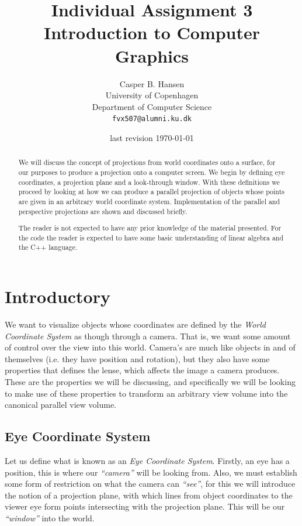 \documentclass[11pt]{article}
\title
{
    {\Large Individual Assignment 3} \\
    Introduction to Computer Graphics
}
\author
{
    Casper B. Hansen \\
    University of Copenhagen \\
    Department of Computer Science \\
    {\tt fvx507@alumni.ku.dk}
}
\date{last revision \today}
\begin{document}
\clearpage\maketitle\vspace{1in}
\begin{multicols}{2}
    \begin{abstract}
        We will discuss the concept of projections from world coordinates onto
        a surface, for our purposes to produce a projection onto a computer
        screen. We begin by defining eye coordinates, a projection plane and
        a look-through window. With these definitions we proceed by looking at
        how we can produce a parallel projection of objects whose points are
        given in an arbitrary world coordinate system. Implementation of the
        parallel and perspective projections are shown and discussed briefly.
        
        The reader is not expected to have any prior knowledge of the material
        presented. For the code the reader is expected to have some basic
        understanding of linear algebra  and the C++ language.
    \end{abstract}
    \vfill\columnbreak\tableofcontents\vfill
\end{multicols}
\thispagestyle{empty}\newpage

\section{Introductory}
We want to visualize objects whose coordinates are defined by the {\it World
Coordinate System} as though through a camera. That is, we want some amount of
control over the view into this world. Camera's are much like objects in and
of themselves (i.e. they have position and rotation), but they also have some
properties that defines the lense, which affects the image a camera produces.
These are the properties we will be discussing, and specifically we will be
looking to make use of these properties to transform an arbitrary view volume
into the canonical parallel view volume.

\subsection{Eye Coordinate System}
\label{sec:intro|sub:eye-coord-sys}
Let us define what is known as an {\it Eye Coordinate System}. Firstly, an eye
has a position, this is where our {\it ``camera''} will be looking from. Also,
we must establish some form of restriction on what the camera can
{\it ``see''}, for this we will introduce the notion of a projection plane,
with which lines from object coordinates to the viewer eye form points
intersecting with the projection plane. This will be our {\it ``window''} into
the world.
\end{document}
